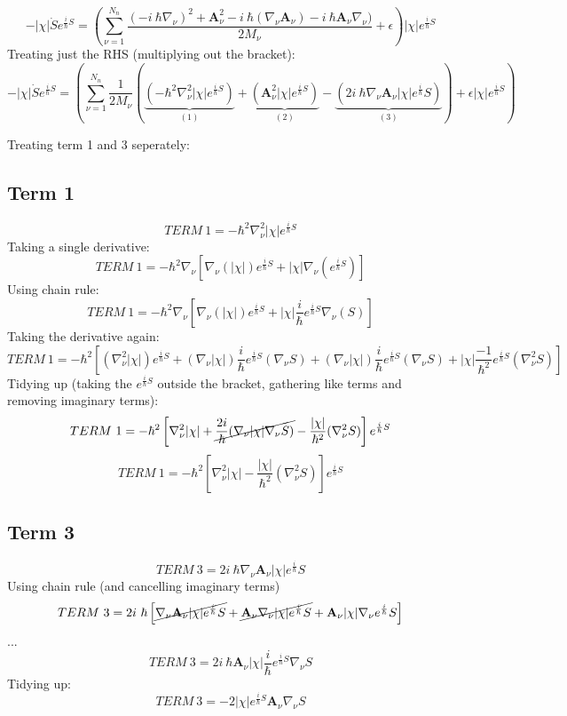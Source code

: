 \[- |\chi| \dot{S} e^{\frac{i}{\hbar}S} = \left( \sum_{\nu = 1}^{N_{n}} \frac{(-i \ \hbar\nabla_{\nu})^2 + \textbf{A}_{\nu}^2 - i \ \hbar (\nabla_{\nu}\textbf{A}_{\nu}) -i \ \hbar \textbf{A}_{\nu}\nabla_{\nu}) }{2 M_{\nu}} + \epsilon \right) |\chi |e^{\frac{i}{\hbar}S}\]
Treating just the RHS (multiplying out the bracket):
\begin{dmath*}
  - |\chi| \dot{S} e^{\frac{i}{\hbar}S} = \left( \sum_{\nu = 1}^{N_{n}} \frac{1}{2 M_{\nu}}\left(
  \underbrace{(- \hbar^2 \nabla_{\nu}^2 |\chi |e^{\frac{i}{\hbar}S})}_{(1)}
  + \underbrace{(\textbf{A}_{\nu}^2|\chi |e^{\frac{i}{\hbar}S})}_{(2)}
  - \underbrace{(2 i \ \hbar \nabla_{\nu}\textbf{A}_{\nu} |\chi |e^{\frac{i}{\hbar}}S)}_{(3)}
 \right) + \epsilon |\chi |e^{\frac{i}{\hbar}S} \right)
\end{dmath*}

\noindent Treating term 1 and 3 seperately:

\subsection{Term 1 \label{ap:polar_X_4}}
\[TERM \ 1 = -\hbar^2\nabla^2_{\nu}|\chi |e^{\frac{i}{\hbar}S}\]
Taking a single derivative:
\[TERM \ 1 = -\hbar^2\nabla_{\nu}\left[ \nabla_{\nu}(|\chi |)e^{\frac{i}{\hbar}S} + |\chi |\nabla_{\nu}(e^{\frac{i}{\hbar}S}) \right]\]
Using chain rule:
\[TERM \ 1 = -\hbar^2\nabla_{\nu}\left[ \nabla_{\nu}(|\chi |)e^{\frac{i}{\hbar}S} + |\chi|\frac{i}{\hbar}e^{\frac{i}{\hbar}S} \nabla_{\nu}(S)  \right]\]
Taking the derivative again:
\[TERM \ 1 = -\hbar^2\left[(\nabla_{\nu}^2|\chi |)e^{\frac{i}{\hbar}S} + (\nabla_{\nu}|\chi |)\frac{i}{\hbar}e^{\frac{i}{\hbar}S} (\nabla_{\nu} S) + (\nabla_{\nu}|\chi|)\frac{i}{\hbar}e^{\frac{i}{\hbar}S} (\nabla_{\nu} S) + |\chi|\frac{-1}{\hbar^2}e^{\frac{i}{\hbar}S} (\nabla_{\nu}^2 S) \right] \]
Tidying up (taking the $e^{\frac{i}{\hbar}S}$ outside the bracket, gathering like terms and removing imaginary terms):
\[TERM \ 1 = -\hbar^2\left[\nabla_{\nu}^2|\chi | + \cancel{\frac{2i}{\hbar} (\nabla_{\nu}|\chi |\nabla_{\nu} S)} - \frac{|\chi|}{\hbar^2}(\nabla_{\nu}^2 S) \right] e^{\frac{i}{\hbar}S} \]
\[TERM \ 1 = -\hbar^2\left[\nabla_{\nu}^2|\chi | - \frac{|\chi|}{\hbar^2}  (\nabla_{\nu}^2 S)\right] e^{\frac{i}{\hbar}S}\]

\subsection{Term 3 \label{ap:polar_X_2}}
\[TERM \ 3  = 2 i \ \hbar \nabla_{\nu}\textbf{A}_{\nu} |\chi |e^{\frac{i}{\hbar}}S\]
Using chain rule (and cancelling imaginary terms)
\[TERM \ 3  = 2 i \ \hbar \left[ \cancel{\nabla_{\nu}\textbf{A}_{\nu} |\chi |e^{\frac{i}{\hbar}}S} + \cancel{\textbf{A}_{\nu} \nabla_{\nu}|\chi |e^{\frac{i}{\hbar}}S} + \textbf{A}_{\nu} |\chi |\nabla_{\nu}e^{\frac{i}{\hbar}}S\right]\]
...
\[TERM \ 3 = 2 i \ \hbar \textbf{A}_{\nu} |\chi |\frac{i}{\hbar}e^{\frac{i}{\hbar}S} \nabla_{\nu}S \]
Tidying up:
\[TERM \ 3 = -2 |\chi |e^{\frac{i}{\hbar}S} \textbf{A}_{\nu} \nabla_{\nu}S \]
